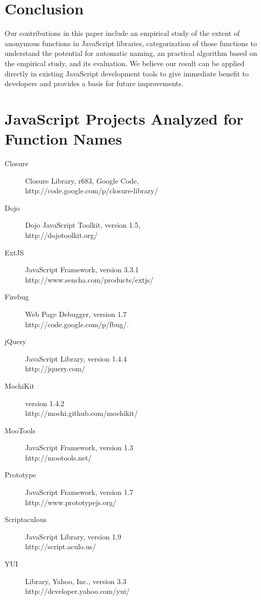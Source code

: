 \documentclass[10pt, preprint]{sigplanconf}
\begin{document}
\section{Conclusion}
Our contributions in this paper include an empirical study of the extent of anonymous functions in JavaScript libraries, categorization of those functions to understand the potential for automatic naming, an practical algorithm based on the empirical study, and its evaluation.   We believe our result can be applied directly in existing JavaScript development tools to give immediate benefit to developers and provides a basis for future improvements.



\appendix
\section{JavaScript Projects Analyzed for Function Names}
\begin{description}
\item[Closure] Closure Library, r683, Google Code, \\
http://code.google.com/p/closure-library/
\item[Dojo] Dojo JavaScript Toolkit, version 1.5, \\
http://dojotoolkit.org/
\item[ExtJS] JavaScript Framework, version 3.3.1 \\
http://www.sencha.com/products/extjs/
\item[Firebug] Web Page Debugger, version 1.7 \\
 http://code.google.com/p/fbug/.
\item[jQuery] JavaScript Library, version 1.4.4\\
http://jquery.com/
\item[MochiKit] version 1.4.2 \\
http://mochi.github.com/mochikit/
\item[MooTools] JavaScript Framework, version 1.3 \\
http://mootools.net/
\item[Prototype] JavaScript Framework, version 1.7 \\
http://www.prototypejs.org/
\item[Scriptaculous] JavaScript Library, version 1.9 \\
http://script.aculo.us/
\item[YUI] Library, Yahoo, Inc., version 3.3 \\
http://developer.yahoo.com/yui/
\end{description}
\end{document}

